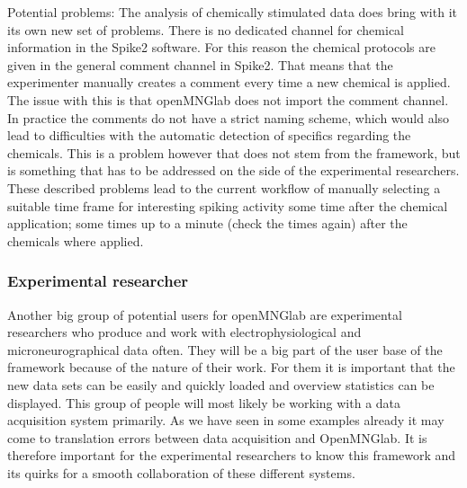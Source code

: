 Potential problems: The analysis of chemically stimulated data does bring with it its own new set of problems. There is no dedicated channel for chemical information in the Spike2 software. For this reason the chemical protocols are given in the general comment channel in Spike2. That means that the experimenter manually creates a comment every time a new chemical is applied. The issue with this is that openMNGlab does not import the comment channel. In practice the comments do not have a strict naming scheme, which would also lead to difficulties with the automatic detection of specifics regarding the chemicals. This is a problem however that does not stem from the framework, but is something that has to be addressed on the side of the experimental researchers.\\
These described problems lead to the current workflow of manually selecting a suitable time frame for interesting spiking activity some time after the chemical application; some times up to a minute (check the times again) after the chemicals where applied.

\subsubsection{Experimental researcher}
Another big group of potential users for openMNGlab are experimental researchers who produce and work with electrophysiological and microneurographical data often. They will be a big part of the user base of the framework because of the nature of their work. For them it is important that the new data sets can be easily and quickly loaded and overview statistics can be displayed. This group of people will most likely be working with a data acquisition system primarily. As we have seen in some examples already it may come to translation errors between data acquisition and OpenMNGlab. It is therefore important for the experimental researchers to know this framework and its quirks for a smooth collaboration of these different systems.


 

